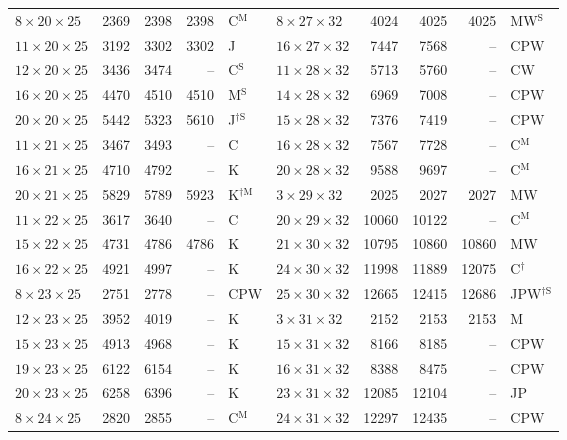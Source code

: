 \begin{longtable}{@{}lrrrl@{\hspace{6mm}}lrrrl@{}}
$8{\times}20{\times}25$ & 2369 & 2398 & 2398 & C$^{\mathrm{M}}$ & $8{\times}27{\times}32$ & 4024 & 4025 & 4025 & MW$^{\mathrm{S}}$\\
$11{\times}20{\times}25$ & 3192 & 3302 & 3302 & J & $16{\times}27{\times}32$ & 7447 & 7568 & -- & CPW\\
$12{\times}20{\times}25$ & 3436 & 3474 & -- & C$^{\mathrm{S}}$ & $11{\times}28{\times}32$ & 5713 & 5760 & -- & CW\\
$16{\times}20{\times}25$ & 4470 & 4510 & 4510 & M$^{\mathrm{S}}$ & $14{\times}28{\times}32$ & 6969 & 7008 & -- & CPW\\
$20{\times}20{\times}25$ & 5442 & 5323 & 5610 & J$^{\dagger\mathrm{S}}$ & $15{\times}28{\times}32$ & 7376 & 7419 & -- & CPW\\
$11{\times}21{\times}25$ & 3467 & 3493 & -- & C & $16{\times}28{\times}32$ & 7567 & 7728 & -- & C$^{\mathrm{M}}$\\
$16{\times}21{\times}25$ & 4710 & 4792 & -- & K & $20{\times}28{\times}32$ & 9588 & 9697 & -- & C$^{\mathrm{M}}$\\
$20{\times}21{\times}25$ & 5829 & 5789 & 5923 & K$^{\dagger\mathrm{M}}$ & $3{\times}29{\times}32$ & 2025 & 2027 & 2027 & MW\\
$11{\times}22{\times}25$ & 3617 & 3640 & -- & C & $20{\times}29{\times}32$ & 10060 & 10122 & -- & C$^{\mathrm{M}}$\\
$15{\times}22{\times}25$ & 4731 & 4786 & 4786 & K & $21{\times}30{\times}32$ & 10795 & 10860 & 10860 & MW\\
$16{\times}22{\times}25$ & 4921 & 4997 & -- & K & $24{\times}30{\times}32$ & 11998 & 11889 & 12075 & C$^{\dagger}$\\
$8{\times}23{\times}25$ & 2751 & 2778 & -- & CPW & $25{\times}30{\times}32$ & 12665 & 12415 & 12686 & JPW$^{\dagger\mathrm{S}}$\\
$12{\times}23{\times}25$ & 3952 & 4019 & -- & K & $3{\times}31{\times}32$ & 2152 & 2153 & 2153 & M\\
$15{\times}23{\times}25$ & 4913 & 4968 & -- & K & $15{\times}31{\times}32$ & 8166 & 8185 & -- & CPW\\
$19{\times}23{\times}25$ & 6122 & 6154 & -- & K & $16{\times}31{\times}32$ & 8388 & 8475 & -- & CPW\\
$20{\times}23{\times}25$ & 6258 & 6396 & -- & K & $23{\times}31{\times}32$ & 12085 & 12104 & -- & JP\\
$8{\times}24{\times}25$ & 2820 & 2855 & -- & C$^{\mathrm{M}}$ & $24{\times}31{\times}32$ & 12297 & 12435 & -- & CPW\\

\end{longtable}
